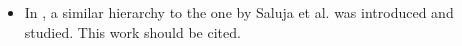 \documentclass[a4paper]{article}
\begin{document}
\vspace{1em}
\begin{itemize}
	\setlength\itemsep{0.5em}
	\item In \cite{DBLP:conf/csl/0001HKV16}, a similar hierarchy to the one by Saluja et al. was introduced and studied. This work should be cited.
\end{itemize}
\end{document}
